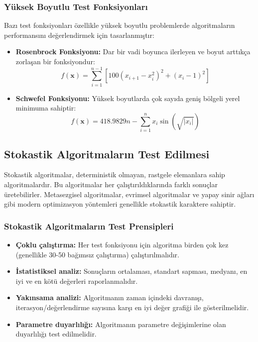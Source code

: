 \subsubsection{Yüksek Boyutlu Test Fonksiyonları}

Bazı test fonksiyonları özellikle yüksek boyutlu problemlerde algoritmaların performansını değerlendirmek için tasarlanmıştır:

\begin{itemize}
    \item \textbf{Rosenbrock Fonksiyonu:} Dar bir vadi boyunca ilerleyen ve boyut arttıkça zorlaşan bir fonksiyondur:
    \begin{equation}
        f(\mathbf{x}) = \sum_{i=1}^{n-1} \left[ 100(x_{i+1} - x_i^2)^2 + (x_i - 1)^2 \right]
    \end{equation}
    
    \item \textbf{Schwefel Fonksiyonu:} Yüksek boyutlarda çok sayıda geniş bölgeli yerel minimuma sahiptir:
    \begin{equation}
        f(\mathbf{x}) = 418.9829n - \sum_{i=1}^{n} x_i\sin(\sqrt{|x_i|})
    \end{equation}
\end{itemize}

\subsection{Stokastik Algoritmaların Test Edilmesi}

Stokastik algoritmalar, deterministik olmayan, rastgele elemanlara sahip algoritmalardır. Bu algoritmalar her çalıştırıldıklarında farklı sonuçlar üretebilirler. Metasezgisel algoritmalar, evrimsel algoritmalar ve yapay sinir ağları gibi modern optimizasyon yöntemleri genellikle stokastik karaktere sahiptir.

\subsubsection{Stokastik Algoritmaların Test Prensipleri}

\begin{itemize}
    \item \textbf{Çoklu çalıştırma:} Her test fonksiyonu için algoritma birden çok kez (genellikle 30-50 bağımsız çalıştırma) çalıştırılmalıdır.
    
    \item \textbf{İstatistiksel analiz:} Sonuçların ortalaması, standart sapması, medyanı, en iyi ve en kötü değerleri raporlanmalıdır.
    
    \item \textbf{Yakınsama analizi:} Algoritmanın zaman içindeki davranışı, iterasyon/değerlendirme sayısına karşı en iyi değer grafiği ile gösterilmelidir.
    
    \item \textbf{Parametre duyarlılığı:} Algoritmanın parametre değişimlerine olan duyarlılığı test edilmelidir.
\end{itemize}

